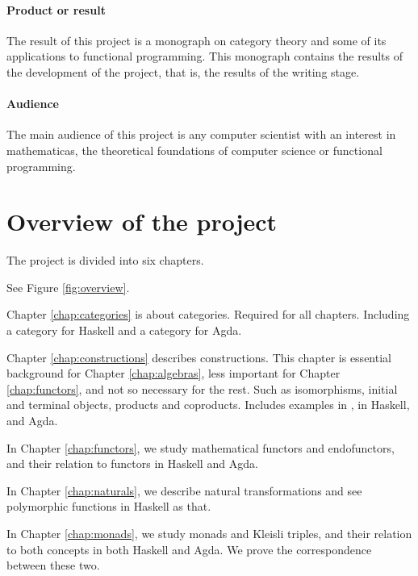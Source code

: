 \paragraph{Product or result}

The result of this project is a monograph on category theory and some
of its applications to functional programming. This monograph contains
the results of the development of the project, that is, the results of
the writing stage.

\paragraph{Audience}

The main audience of this project is any computer scientist with an
interest in mathematicas, the theoretical foundations of computer
science or functional programming.

\section*{Overview of the project}

The project is divided into six chapters.

 See Figure \ref{fig:overview}.

Chapter \ref{chap:categories} is about categories. Required for all
chapters. Including a category for Haskell and a category for Agda.

Chapter \ref{chap:constructions} describes constructions. This chapter
is essential background for Chapter \ref{chap:algebras}, less
important for Chapter \ref{chap:functors}, and not so necessary for
the rest. Such as isomorphisms, initial and terminal objects, products
and coproducts. Includes examples in \set, in Haskell, and Agda.

In Chapter \ref{chap:functors}, we study mathematical functors and
endofunctors, and their relation to functors in Haskell and Agda.

In Chapter \ref{chap:naturals}, we describe natural transformations
and see polymorphic functions in Haskell as that.

In Chapter \ref{chap:monads}, we study monads and Kleisli triples, and
their relation to both concepts in both Haskell and Agda. We prove the
correspondence between these two.

